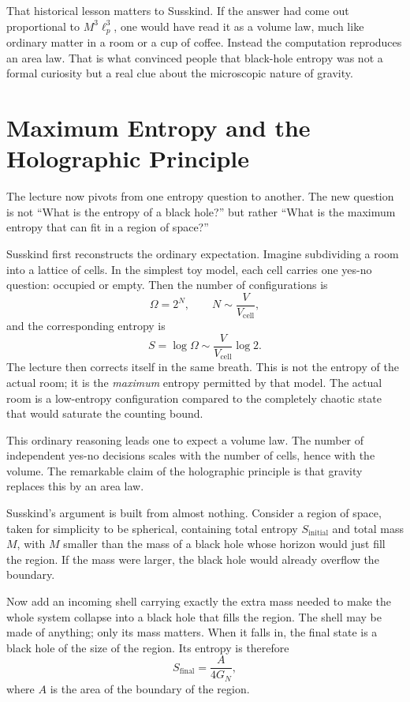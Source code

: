 That historical lesson matters to Susskind. If the answer had come out proportional to \(M^3\ell_p^3\), one would have read it as a volume law, much like ordinary matter in a room or a cup of coffee. Instead the computation reproduces an area law. That is what convinced people that black-hole entropy was not a formal curiosity but a real clue about the microscopic nature of gravity.

\section{Maximum Entropy and the Holographic Principle}

The lecture now pivots from one entropy question to another. The new question is not ``What is the entropy of a black hole?'' but rather ``What is the maximum entropy that can fit in a region of space?''

Susskind first reconstructs the ordinary expectation. Imagine subdividing a room into a lattice of cells. In the simplest toy model, each cell carries one yes-no question: occupied or empty. Then the number of configurations is
\begin{equation}
\Omega = 2^N,
\qquad
N \sim \frac{V}{V_{\mathrm{cell}}},
\end{equation}
and the corresponding entropy is
\begin{equation}
S=\log \Omega \sim \frac{V}{V_{\mathrm{cell}}}\log 2.
\end{equation}
The lecture then corrects itself in the same breath. This is not the entropy of the actual room; it is the \emph{maximum} entropy permitted by that model. The actual room is a low-entropy configuration compared to the completely chaotic state that would saturate the counting bound.

This ordinary reasoning leads one to expect a volume law. The number of independent yes-no decisions scales with the number of cells, hence with the volume. The remarkable claim of the holographic principle is that gravity replaces this by an area law.

Susskind's argument is built from almost nothing. Consider a region of space, taken for simplicity to be spherical, containing total entropy \(S_{\mathrm{initial}}\) and total mass \(M\), with \(M\) smaller than the mass of a black hole whose horizon would just fill the region. If the mass were larger, the black hole would already overflow the boundary.

Now add an incoming shell carrying exactly the extra mass needed to make the whole system collapse into a black hole that fills the region. The shell may be made of anything; only its mass matters. When it falls in, the final state is a black hole of the size of the region. Its entropy is therefore
\begin{equation}
S_{\mathrm{final}}=\frac{A}{4G_N},
\end{equation}
where \(A\) is the area of the boundary of the region.

